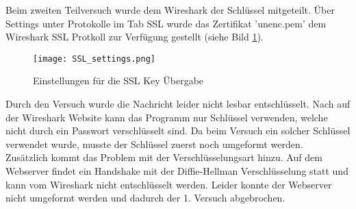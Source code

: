 	Beim zweiten Teilversuch wurde dem Wireshark der Schlüssel mitgeteilt. Über Settings unter Protokolle im Tab SSL wurde das Zertifikat 'unenc.pem' dem Wireshark SSL Protkoll zur Verfügung gestellt (siehe Bild \ref{fig:ssl_settings}).
	\begin{figure}[H]
		\centering
		\texttt{[image: SSL\_settings.png]}
		\caption{Einstellungen für die SSL Key Übergabe}
		\label{fig:ssl_settings}
	\end{figure}
	Durch den Versuch wurde die Nachricht leider nicht lesbar entschlüsselt. Nach  auf der Wireshark Website kann das Programm nur Schlüssel verwenden, welche nicht durch ein Passwort verschlüsselt sind. Da beim Versuch ein solcher Schlüssel verwendet wurde, musste der Schlüssel zuerst noch umgeformt werden.\\
	Zusätzlich kommt das Problem mit der Verschlüsselungsart hinzu. Auf dem Webserver findet ein Handshake mit der Diffie-Hellman Verschlüsselung statt und kann vom Wireshark nicht entschlüsselt werden. Leider konnte der Webserver nicht umgeformt werden und dadurch der 1. Versuch abgebrochen.\\
	
